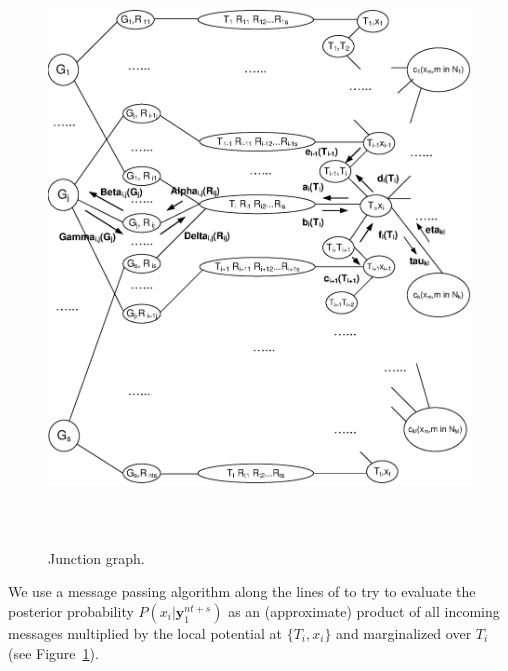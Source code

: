 \begin{figure}\label{juncfig}
\vspace{0.0in}\hspace{0.0in}\includegraphics[width=5.0in,height=6.2in]{Drawing11new.eps}
\caption{Junction graph.}
\end{figure}




We use a message passing algorithm along the lines of \cite{aji} to
try to evaluate  the posterior probability
$P(x_i|\mathbf{y}_1^{nt+s})$ as an (approximate) product of all
incoming messages multiplied by the local potential at $\{T_i,x_i\}$
and marginalized over $T_i$ (see Figure~\ref{juncfig}).


